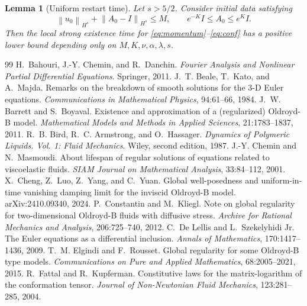 \documentclass[10pt,a4paper]{amsart}
\numberwithin{equation}{section}
\newtheorem{lemma}[theorem]{Lemma}
\newcommand{\Id}{I}
\newcommand{\norm}[1]{\left\lVert #1\right\rVert}
\begin{document}
\begin{lemma}[Uniform restart time]
\label{lem:appendix-restart}
Let \(s>5/2\).  Consider initial data satisfying
\[
  \norm{u_0}_{H^s}+\norm{A_0-\Id}_{H^s}\le M,
  \qquad
  e^{-K}\Id\le A_0\le e^K\Id .
\]
Then the local strong existence time for \eqref{eq:momentum}--\eqref{eq:conf}
has a positive lower bound depending only on \(M,K,\nu,\alpha,\lambda,s\).
\end{lemma}


\begin{thebibliography}{99}
 H.~Bahouri, J.-Y. Chemin, and R.~Danchin. \newblock \emph{Fourier Analysis and Nonlinear Partial Differential Equations}. \newblock Springer, 2011.
 J.~T. Beale, T.~Kato, and A.~Majda. \newblock Remarks on the breakdown of smooth solutions for the 3-D Euler equations. \newblock \emph{Communications in Mathematical Physics}, 94:61--66, 1984.
 J.~W. Barrett and S.~Boyaval. \newblock Existence and approximation of a (regularized) Oldroyd-B model. \newblock \emph{Mathematical Models and Methods in Applied Sciences}, 21:1783--1837, 2011.
 R.~B. Bird, R.~C. Armstrong, and O.~Hassager. \newblock \emph{Dynamics of Polymeric Liquids. Vol. 1: Fluid Mechanics}. \newblock Wiley, second edition, 1987.
 J.-Y. Chemin and N.~Masmoudi. \newblock About lifespan of regular solutions of equations related to viscoelastic fluids. \newblock \emph{SIAM Journal on Mathematical Analysis}, 33:84--112, 2001.
 X.~Cheng, Z.~Luo, Z.~Yang, and C.~Yuan. \newblock Global well-posedness and uniform-in-time vanishing damping limit for the inviscid Oldroyd-B model. \newblock arXiv:2410.09340, 2024.
 P.~Constantin and M.~Kliegl. \newblock Note on global regularity for two-dimensional Oldroyd-B fluids with diffusive stress. \newblock \emph{Archive for Rational Mechanics and Analysis}, 206:725--740, 2012.
 C.~De Lellis and L.~Szekelyhidi Jr. \newblock The Euler equations as a differential inclusion. \newblock \emph{Annals of Mathematics}, 170:1417--1436, 2009.
 T.~M. Elgindi and F.~Rousset. \newblock Global regularity for some Oldroyd-B type models. \newblock \emph{Communications on Pure and Applied Mathematics}, 68:2005--2021, 2015.
 R.~Fattal and R.~Kupferman. \newblock Constitutive laws for the matrix-logarithm of the conformation tensor. \newblock \emph{Journal of Non-Newtonian Fluid Mechanics}, 123:281--285, 2004.

\end{thebibliography}
\end{document}
